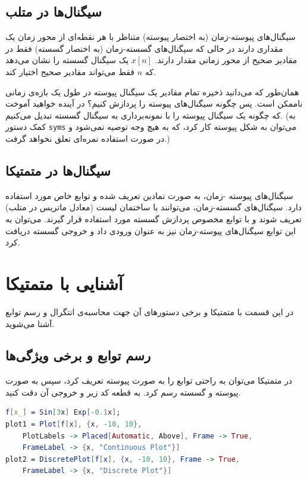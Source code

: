 \documentclass{utsignal}
\begin{document}
	\subsection{سیگنال‌ها در متلب}
	سیگنال‌های پیوسته-زمان  (به اختصار پیوسته) متناظر با هر نقطه‌ای از محور زمان یک مقداری دارند در حالی که سیگنال‌‌های گسسته-زمان (به اختصار گسسته) فقط در مقادیر صحیح از محور زمانی مقدار دارند. $x[n]$ یک سیگنال گسسته را نشان می‌دهد که $n$ فقط می‌تواند مقادیر صحیح اختیار کند.
	
	همان‌طور که می‌دانید ذخیره تمام مقادیر یک سیگنال پیوسته در طول یک بازه‌ی زمانی ناممکن است. پس چگونه سیگنال‌های پیوسته را پردازش کنیم؟ در آینده خواهید آموخت که چگونه یک سیگنال پیوسته را با نمونه‌برداری به سیگنال گسسته تبدیل می‌کنیم. (به کمک دستور \lstinline[language=Octave]{syms} می‌توان به شکل پیوسته کار کرد، که به هیچ وجه توصیه نمی‌شود و در صورت استفاده نمره‌ای تعلق نخواهد گرفت.)

	\subsection{سیگنال‌ها در متمتیکا}
	سیگنال‌های پیوسته -زمان، به صورت نمادین تعریف شده و توابع خاص مورد استفاده دارد. سیگنال‌های گسسته-زمان، می‌توانند با ساختمان لیست  (معادل ماتریس در متلب) تعریف شوند و با توابع مخصوص پردازش گسسته مورد استفاده قرار گیرند. می‌توان به این توابع سیگنال‌های پیوسته-زمان نیز به عنوان ورودی داد و خروجی گسسته دریافت کرد.
	\section{آشنایی با متمتیکا}
	در این قسمت با متمتیکا و برخی دستورهای آن جهت محاسبه‌ی انتگرال و رسم توابع آشنا می‌شوید.
	\subsection{رسم توابع و برخی ویژگی‌ها}
	در متمتیکا می‌توان به راحتی توابع را به صورت پیوسته تعریف کرد، سپس به صورت پیوسته و گسسته رسم کرد. به قطعه کد زیر و خروجی آن دقت کنید.
	\begin{latin}
		\renewcommand{\lstlistingname}{Listing}
		\begin{lstlisting}[extendedchars=true,language=Mathematica]
f[x_] = Sin[3x] Exp[-0.1x];
plot1 = Plot[f[x], {x, -10, 10}, 
	PlotLabels -> Placed[Automatic, Above], Frame -> True, 
	FrameLabel -> {x, "Continuous Plot"}]
plot2 = DiscretePlot[f[x], {x, -10, 10}, Frame -> True, 
	FrameLabel -> {x, "Discrete Plot"}]\end{lstlisting}
	\end{latin}
	
\end{document}
